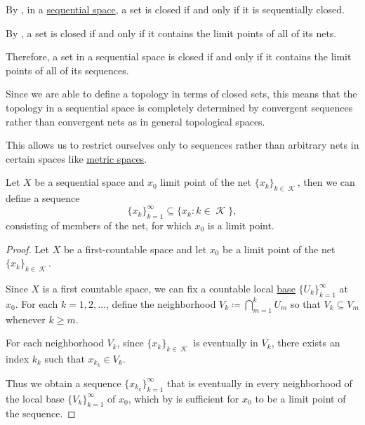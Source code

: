 \begin{remark}\label{rem:sequential_spaces}
  By , in a \hyperref[def:sequential_space]{sequential space}, a set is closed if and only if it is sequentially closed.

  By , a set is closed if and only if it contains the limit points of all of its nets.

  Therefore, a set in a sequential space is closed if and only if it contains the limit points of all of its sequences.

  Since we are able to define a topology in terms of closed sets, this means that the topology in a sequential space is completely determined by convergent sequences rather than convergent nets as in general topological spaces.

  This allows us to restrict ourselves only to sequences rather than arbitrary nets in certain spaces like \hyperref[def:metric_space]{metric spaces}.
\end{remark}

\begin{lemma}\label{thm:sequential_space_convergence}
  Let \( X \) be a sequential space and \( x_0 \) limit point of the net \( \{ x_k \}_{k \in \mscrK} \), then we can define a sequence
  \begin{equation*}
    \{ x_k \}_{k=1}^\infty \subseteq \{ x_k \colon k \in \mscrK \},
  \end{equation*}
  consisting of members of the net, for which \( x_0 \) is a limit point.
\end{lemma}
\begin{proof}
  Let \( X \) be a first-countable space and let \( x_0 \) be a limit point of the net \( \{ x_k \}_{k \in \mscrK} \).

  Since \( X \) is a first countable space, we can fix a countable local \hyperref[def:topological_local_base]{base} \( \{ U_k \}_{k=1}^\infty \) at \( x_0 \). For each \( k = 1, 2, \ldots \), define the neighborhood \( V_k \coloneqq \bigcap_{m=1}^k U_m \) so that \( V_k \subseteq V_m \) whenever \( k \geq m \).

  For each neighborhood \( V_k \), since \( \{ x_k \}_{k \in \mscrK} \) is eventually in \( V_k \), there exists an index \( k_k \) such that \( x_{k_k} \in V_k \).

  Thus we obtain a sequence \( \{ x_{k_k} \}_{k=1}^\infty \) that is eventually in every neighborhood of the local base \( \{ V_k \}_{k=1}^\infty \) of \( x_0 \), which by  is sufficient for \( x_0 \) to be a limit point of the sequence.
\end{proof}

